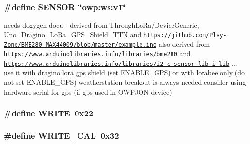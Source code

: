 \hypertarget{OWP__DG__GPS__WeatherStation_8ino_a84f1ead330bbcc83a63929c4726080d7}{
\subsubsection[{S\-E\-N\-S\-O\-R}]{\setlength{\rightskip}{0pt plus 5cm}\#define S\-E\-N\-S\-O\-R~\char`\"{}owp\-:ws\-:v1\char`\"{}}}\label{OWP__DG__GPS__WeatherStation_8ino_a84f1ead330bbcc83a63929c4726080d7}
needs doxygen docu -\/ derived from Through\-Lo\-Ra/\-Device\-Generic, Uno\-\_\-\-Dragino\-\_\-\-Lo\-Ra\-\_\-\-G\-P\-S\-\_\-\-Shield\-\_\-\-T\-T\-N and \href{https://github.com/Play-Zone/BME280_MAX44009/blob/master/example.ino}{\tt https\-://github.\-com/\-Play-\/\-Zone/\-B\-M\-E280\-\_\-\-M\-A\-X44009/blob/master/example.\-ino} also derived from \href{https://www.arduinolibraries.info/libraries/bme280}{\tt https\-://www.\-arduinolibraries.\-info/libraries/bme280} and \href{https://www.arduinolibraries.info/libraries/i2-c-sensor-lib-i-lib}{\tt https\-://www.\-arduinolibraries.\-info/libraries/i2-\/c-\/sensor-\/lib-\/i-\/lib} ... use it with dragino lora gps shield (set E\-N\-A\-B\-L\-E\-\_\-\-G\-P\-S) or with lorabee only (do not set E\-N\-A\-B\-L\-E\-\_\-\-G\-P\-S) weatherstation breakout is always needed consider using hardware serial for gps (if gps used in O\-W\-P\-J\-O\-N device) \hypertarget{OWP__DG__GPS__WeatherStation_8ino_aa10f470e996d0f51210d24f442d25e1e}{
\subsubsection[{W\-R\-I\-T\-E}]{\setlength{\rightskip}{0pt plus 5cm}\#define W\-R\-I\-T\-E~0x22}}\label{OWP__DG__GPS__WeatherStation_8ino_aa10f470e996d0f51210d24f442d25e1e}
\hypertarget{OWP__DG__GPS__WeatherStation_8ino_a9418b096dba157494f523dc01b82a760}{
\subsubsection[{W\-R\-I\-T\-E\-\_\-\-C\-A\-L}]{\setlength{\rightskip}{0pt plus 5cm}\#define W\-R\-I\-T\-E\-\_\-\-C\-A\-L~0x32}}\label{OWP__DG__GPS__WeatherStation_8ino_a9418b096dba157494f523dc01b82a760}


